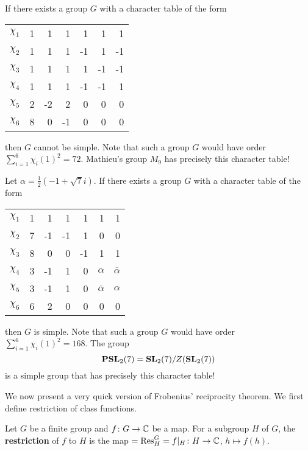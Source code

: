\begin{example}
    If there exists a group $G$ with
    a character table 
    of the form
    \begin{center}
		\begin{tabular}{|c|rrrrrr|}
			\hline
			$\chi_{1}$ & 1 & 1 & 1 & 1 & 1 & 1\tabularnewline
			$\chi_{2}$ & 1 & 1 & 1 & -1 & 1 & -1 \tabularnewline
			$\chi_{3}$ & 1 & 1 & 1 & 1 & -1 & -1\tabularnewline
		    $\chi_{4}$ & 1 & 1 & 1 & -1 & -1 & 1\tabularnewline
			$\chi_{5}$ & 2 & -2 & 2 & 0 & 0 & 0\tabularnewline
			$\chi_{6}$ & 8 & 0 & -1 & 0 & 0 & 0\tabularnewline
			\hline
		\end{tabular}
	\end{center}
	then $G$ cannot be simple. Note that such a group $G$ would have order $\sum_{i=1}^6\chi_i(1)^2=72$. 
	Mathieu's group $M_{9}$ has precisely this character table! 
\end{example}

\begin{example}
    Let $\alpha=\frac{1}{2}(-1+\sqrt{7}i)$. 
    If there exists a group $G$ with a character table
    of the form
    \begin{center}
		\begin{tabular}{|c|rrrrrr|}
			\hline
			$\chi_{1}$ & 1 & 1 & 1 & 1 & 1 & 1\tabularnewline
			$\chi_{2}$ & 7 & -1 & -1 & 1 & 0 & 0 \tabularnewline
			$\chi_{3}$ & 8 & 0 & 0 & -1 & 1 & 1\tabularnewline
		    $\chi_{4}$ & 3 & -1 & 1 & 0 & $\alpha$ & $\overline{\alpha}$ \tabularnewline
			$\chi_{5}$ & 3 & -1 & 1 & 0 & $\overline{\alpha}$ & $\alpha$\tabularnewline
			$\chi_{6}$ & 6 & 2 & 0 & 0 & 0 & 0\tabularnewline
			\hline
		\end{tabular}
	\end{center}    
	then $G$ is simple. Note that such a group $G$ would have order 
	$\sum_{i=1}^6\chi_i(1)^2=168$. 
	The group  
	\[
	\mathbf{PSL}_2(7)=\mathbf{SL}_2(7)/Z(\mathbf{SL}_2(7))
	\]
	is a simple group that has precisely this character table!  
\end{example}



We now present a very quick version of Frobenius'
reciprocity theorem. We first 
define restriction of class functions. 

\begin{definition}
    Let $G$ be a finite group and $f\colon G\to\mathbb{C}$ be
    a map. For a subgroup $H$ of $G$, the \textbf{restriction}
    of $f$ to $H$ is the map 
    $=\operatorname{Res}_H^G=f|_H\colon H\to\mathbb{C}$, $h\mapsto f(h)$. 
\end{definition}

